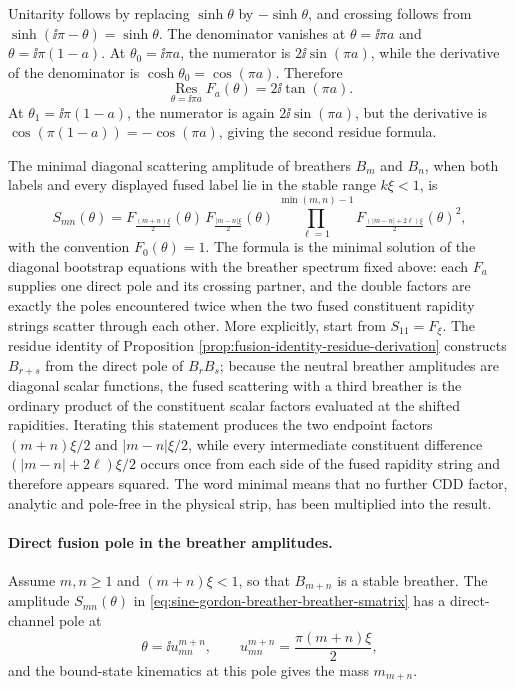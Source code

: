 Unitarity follows by replacing \(\sinh\theta\) by \(-\sinh\theta\), and
crossing follows from \(\sinh(\ii\pi-\theta)=\sinh\theta\).  The denominator
vanishes at \(\theta=\ii\pi a\) and \(\theta=\ii\pi(1-a)\).  At
\(\theta_0=\ii\pi a\), the numerator is \(2\ii\sin(\pi a)\), while the
derivative of the denominator is \(\cosh\theta_0=\cos(\pi a)\).  Therefore
\[
  \operatorname*{Res}_{\theta=\ii\pi a}F_a(\theta)
  =
  2\ii\tan(\pi a).
\]
At \(\theta_1=\ii\pi(1-a)\), the numerator is again
\(2\ii\sin(\pi a)\), but the derivative is
\(\cos(\pi(1-a))=-\cos(\pi a)\), giving the second residue formula.

The minimal diagonal scattering amplitude of breathers \(B_m\) and \(B_n\),
when both labels and every displayed fused label lie in the stable range
\(k\xi<1\), is
\begin{equation}
  S_{mn}(\theta)
  =
  F_{\frac{(m+n)\xi}{2}}(\theta)\,
  F_{\frac{|m-n|\xi}{2}}(\theta)\,
  \prod_{\ell=1}^{\min(m,n)-1}
  F_{\frac{(|m-n|+2\ell)\xi}{2}}(\theta)^2 ,
  \label{eq:sine-gordon-breather-breather-smatrix}
\end{equation}
with the convention \(F_0(\theta)=1\).  The formula is the minimal solution
of the diagonal bootstrap equations with the breather spectrum fixed above:
each \(F_a\) supplies one direct pole and its crossing partner, and the
double factors are exactly the poles encountered twice when the two fused
constituent rapidity strings scatter through each other.  More explicitly,
start from \(S_{11}=F_\xi\).  The residue identity of Proposition
\ref{prop:fusion-identity-residue-derivation} constructs \(B_{r+s}\) from
the direct pole of \(B_rB_s\); because the neutral breather amplitudes are
diagonal scalar functions, the fused scattering with a third breather is the
ordinary product of the constituent scalar factors evaluated at the shifted
rapidities.  Iterating this statement produces the two endpoint factors
\((m+n)\xi/2\) and \(|m-n|\xi/2\), while every intermediate constituent
difference \((|m-n|+2\ell)\xi/2\) occurs once from each side of the fused
rapidity string and therefore appears squared.  The word minimal means that
no further CDD factor, analytic and pole-free in the physical strip, has been
multiplied into the result.

\paragraph{Direct fusion pole in the breather amplitudes.}
Assume \(m,n\ge1\) and \((m+n)\xi<1\), so that \(B_{m+n}\) is a stable
breather.  The amplitude \(S_{mn}(\theta)\) in
\eqref{eq:sine-gordon-breather-breather-smatrix} has a direct-channel pole at
\[
  \theta=\ii u_{mn}^{m+n},
  \qquad
  u_{mn}^{m+n}=\frac{\pi(m+n)\xi}{2},
\]
and the bound-state kinematics at this pole gives the mass \(m_{m+n}\).

